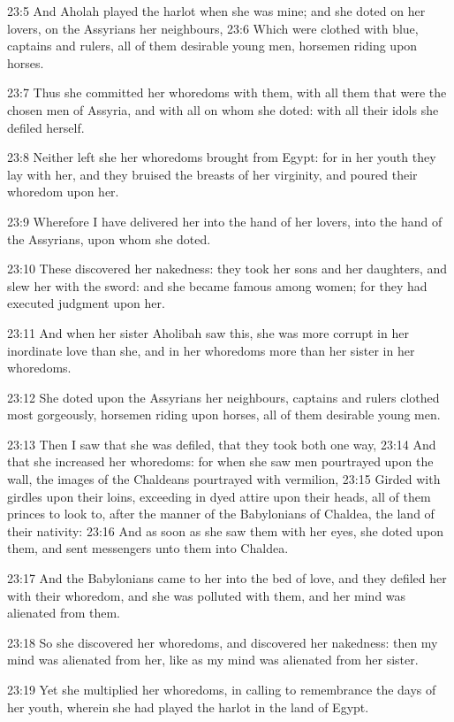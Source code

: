 23:5 And Aholah played the harlot when she was mine; and she doted on
her lovers, on the Assyrians her neighbours, 23:6 Which were clothed
with blue, captains and rulers, all of them desirable young men,
horsemen riding upon horses.

23:7 Thus she committed her whoredoms with them, with all them that
were the chosen men of Assyria, and with all on whom she doted: with
all their idols she defiled herself.

23:8 Neither left she her whoredoms brought from Egypt: for in her
youth they lay with her, and they bruised the breasts of her
virginity, and poured their whoredom upon her.

23:9 Wherefore I have delivered her into the hand of her lovers, into
the hand of the Assyrians, upon whom she doted.

23:10 These discovered her nakedness: they took her sons and her
daughters, and slew her with the sword: and she became famous among
women; for they had executed judgment upon her.

23:11 And when her sister Aholibah saw this, she was more corrupt in
her inordinate love than she, and in her whoredoms more than her
sister in her whoredoms.

23:12 She doted upon the Assyrians her neighbours, captains and rulers
clothed most gorgeously, horsemen riding upon horses, all of them
desirable young men.

23:13 Then I saw that she was defiled, that they took both one way,
23:14 And that she increased her whoredoms: for when she saw men
pourtrayed upon the wall, the images of the Chaldeans pourtrayed with
vermilion, 23:15 Girded with girdles upon their loins, exceeding in
dyed attire upon their heads, all of them princes to look to, after
the manner of the Babylonians of Chaldea, the land of their nativity:
23:16 And as soon as she saw them with her eyes, she doted upon them,
and sent messengers unto them into Chaldea.

23:17 And the Babylonians came to her into the bed of love, and they
defiled her with their whoredom, and she was polluted with them, and
her mind was alienated from them.

23:18 So she discovered her whoredoms, and discovered her nakedness:
then my mind was alienated from her, like as my mind was alienated
from her sister.

23:19 Yet she multiplied her whoredoms, in calling to remembrance the
days of her youth, wherein she had played the harlot in the land of
Egypt.

